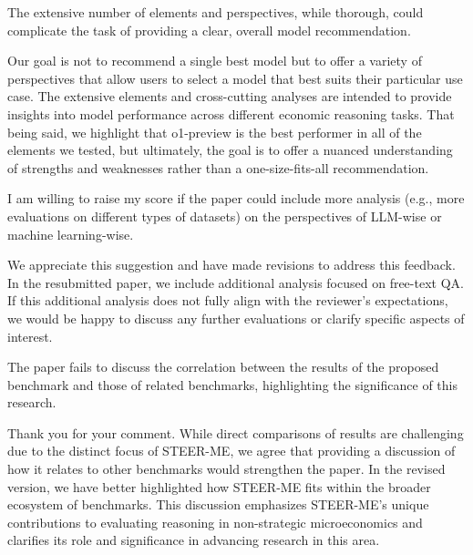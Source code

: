 \documentclass[12pt]{rebuttal_style}
\newcommand{\narun}[1]{\ColorNote{red}{Narun}{#1}}
\begin{document}
\begin{revcomment}
    The extensive number of elements and perspectives, while thorough, could complicate the task of providing a clear, overall model recommendation.
\end{revcomment}
\begin{response}
    Our goal is not to recommend a single best model but to offer a variety of perspectives that allow users to select a model that best suits their particular use case. The extensive elements and cross-cutting analyses are intended to provide insights into model performance across different economic reasoning tasks. That being said, we highlight that o1-preview is the best performer in all of the elements we tested, but ultimately, the goal is to offer a nuanced understanding of strengths and weaknesses rather than a one-size-fits-all recommendation.
\end{response}



\begin{revcomment}
    I am willing to raise my score if the paper could include more analysis (e.g., more evaluations on different types of datasets) on the perspectives of LLM-wise or machine learning-wise.
\end{revcomment}
\begin{response}
    We appreciate this suggestion and have made revisions to address this feedback. In the resubmitted paper, we include additional analysis focused on free-text QA. If this additional analysis does not fully align with the reviewer's expectations, we would be happy to discuss any further evaluations or clarify specific aspects of interest.
\end{response}

\nextreviewer

\begin{revcomment}
    The paper fails to discuss the correlation between the results of the proposed benchmark and those of related benchmarks, highlighting the significance of this research.
\end{revcomment}
\begin{response}
    Thank you for your comment. While direct comparisons of results are challenging due to the distinct focus of STEER-ME, we agree that providing a discussion of how it relates to other benchmarks would strengthen the paper. In the revised version, we have better highlighted how STEER-ME fits within the broader ecosystem of benchmarks. This discussion emphasizes STEER-ME's unique contributions to evaluating reasoning in non-strategic microeconomics and clarifies its role and significance in advancing research in this area.
\end{response}
\end{document}
